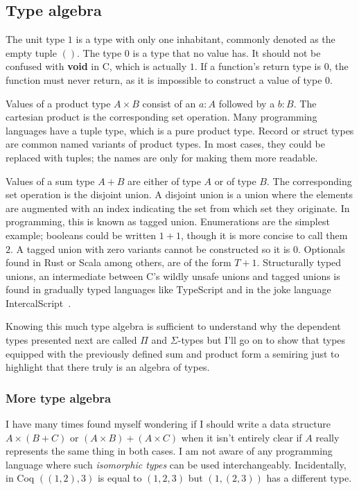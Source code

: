 \documentclass[english, 12pt, a4paper, sci, a-1b, online]{aaltothesis}
\begin{document}
\subsection{Type algebra}

The unit type $1$ is a type with only one inhabitant, commonly denoted as the empty tuple $()$. The type $0$ is a type that no value has. It should not be confused with \textbf{void} in C, which is actually $1$. If a function's return type is $0$, the function must never return, as it is impossible to construct a value of type $0$.

Values of a product type $A \times B$ consist of an $a : A$ followed by a $b : B$. The cartesian product is the corresponding set operation. Many programming languages have a tuple type, which is a pure product type. Record or struct types are common named variants of product types. In most cases, they could be replaced with tuples; the names are only for making them more readable.

Values of a sum type $A + B$ are either of type $A$ or of type $B$. The corresponding set operation is the disjoint union. A disjoint union is a union where the elements are augmented with an index indicating the set from which set they originate. In programming, this is known as tagged union. Enumerations are the simplest example; booleans could be written $1 + 1$, though it is more concise to call them $2$. A tagged union with zero variants cannot be constructed so it is $0$. Optionals found in Rust or Scala among others, are of the form $T + 1$. Structurally typed unions, an intermediate between C's wildly unsafe unions and tagged unions is found in gradually typed languages like TypeScript and in the joke language IntercalScript~\cite{ICS}.

Knowing this much type algebra is sufficient to understand why the dependent types presented next are called $\Pi$ and $\Sigma$-types but I'll go on to show that types equipped with the previously defined sum and product form a semiring just to highlight that there truly is an algebra of types.

\subsubsection{More type algebra}

I have many times found myself wondering if I should write a data structure $A \times (B + C)$ or $(A \times B) + (A \times C)$ when it isn't entirely clear if $A$ really represents the same thing in both cases. I am not aware of any programming language where such \emph{isomorphic types} can be used interchangeably. Incidentally, in Coq $((1, 2), 3)$ is equal to $(1, 2, 3)$ but $(1, (2, 3))$ has a different type.
\end{document}
